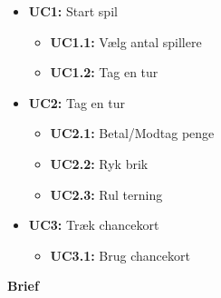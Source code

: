 \begin{itemize}
    \item \textbf{UC1:} Start spil
    \begin{itemize}
        \item \textbf{UC1.1:} Vælg antal spillere
        \item \textbf{UC1.2:} Tag en tur
    \end{itemize}
    \item \textbf{UC2:} Tag en tur
    \begin{itemize}
        \item \textbf{UC2.1:} Betal/Modtag penge
        \item \textbf{UC2.2:} Ryk brik
        \item \textbf{UC2.3:} Rul terning
    \end{itemize}
    \item \textbf{UC3:} Træk chancekort
    \begin{itemize}
        \item \textbf{UC3.1:} Brug chancekort
    \end{itemize}
\end{itemize}


\textbf{Brief}


